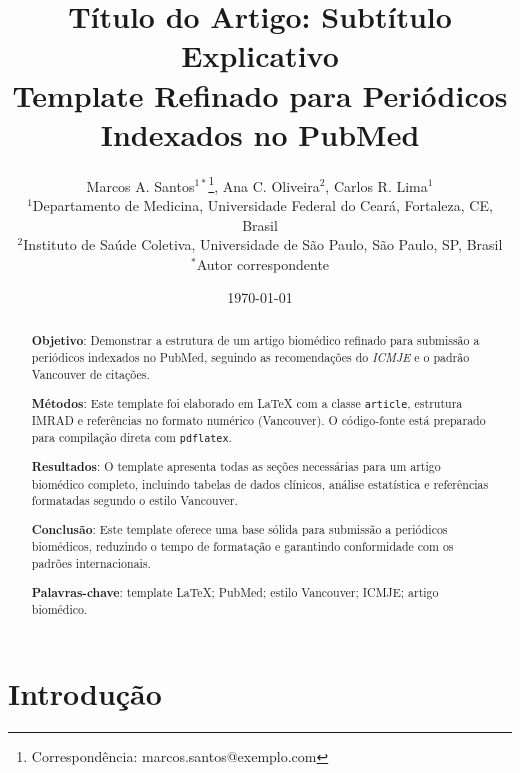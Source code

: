 \documentclass[12pt,a4paper]{article}
\newcommand{\ICMJE}{\textit{ICMJE}}
\begin{document}
\title{T\'itulo do Artigo: Subt\'itulo Explicativo \\
        \large Template Refinado para Peri\'odicos Indexados no PubMed}

\author{Marcos A. Santos$^{1*}$\thanks{Correspond\^encia: marcos.santos@exemplo.com},
        Ana C. Oliveira$^{2}$,
        Carlos R. Lima$^{1}$ \\
        \small $^{1}$Departamento de Medicina, Universidade Federal do Cear\'a,
        Fortaleza, CE, Brasil \\
        \small $^{2}$Instituto de Sa\'ude Coletiva, Universidade de S\~ao Paulo,
        S\~ao Paulo, SP, Brasil \\
        \small $^{*}$Autor correspondente}

\date{\today}

\maketitle

\begin{abstract}
\textbf{Objetivo}: Demonstrar a estrutura de um artigo biom\'edico
refinado para submiss\~ao a peri\'odicos indexados no PubMed,
seguindo as recomenda\c{c}\~oes do \ICMJE{} e o padr\~ao Vancouver
de cita\c{c}\~oes.

\textbf{M\'etodos}: Este template foi elaborado em \LaTeX{} com
a classe \texttt{article}, estrutura IMRAD e refer\^encias no
formato num\'erico (Vancouver). O c\'odigo-fonte est\'a preparado
para compila\c{c}\~ao direta com \texttt{pdflatex}.

\textbf{Resultados}: O template apresenta todas as se\c{c}\~oes
necess\'arias para um artigo biom\'edico completo, incluindo tabelas
de dados cl\'inicos, an\'alise estat\'istica e refer\^encias
formatadas segundo o estilo Vancouver.

\textbf{Conclus\~ao}: Este template oferece uma base s\'olida para
submiss\~ao a peri\'odicos biom\'edicos, reduzindo o tempo de
formata\c{c}\~ao e garantindo conformidade com os padr\~oes
internacionais.

\textbf{Palavras-chave}: template LaTeX; PubMed; estilo Vancouver;
ICMJE; artigo biom\'edico.
\end{abstract}

\section{Introdu\c{c}\~ao}
\label{sec:intro}
\end{document}
